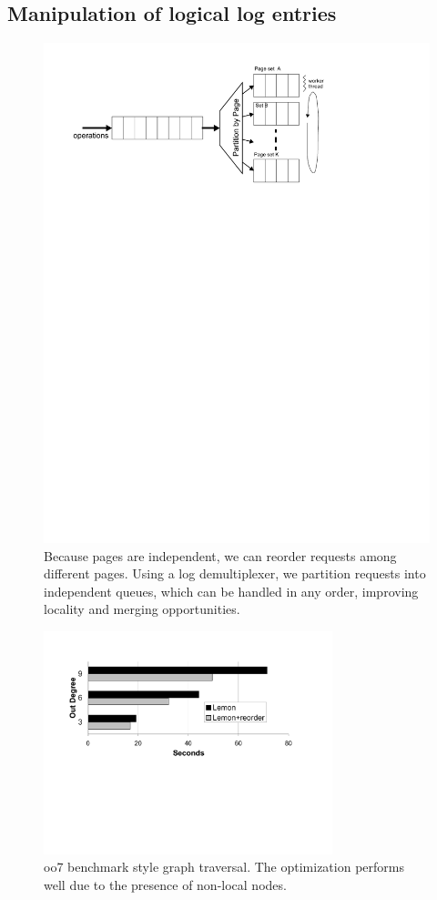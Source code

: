 \documentclass[letterpaper,twocolumn,10pt]{article}
\begin{document}
\subsection{Manipulation of logical log entries}

\begin{figure}
\includegraphics[width=1\columnwidth]{figs/graph-traversal.pdf}
\vspace{-24pt}
\caption{\sf\label{fig:multiplexor} Because pages are independent, we
can reorder requests among different pages. Using a log demultiplexer,
we partition requests into independent queues, which can be 
handled in any order, improving locality and merging opportunities.}
\end{figure}
\begin{figure}[t]
\includegraphics[width=3.3in]{figs/oo7.pdf}
\vspace{-15pt}
\caption{\sf\label{fig:oo7} oo7 benchmark style graph traversal.  The optimization performs well due to the presence of non-local nodes.}
\end{figure}
\end{document}
